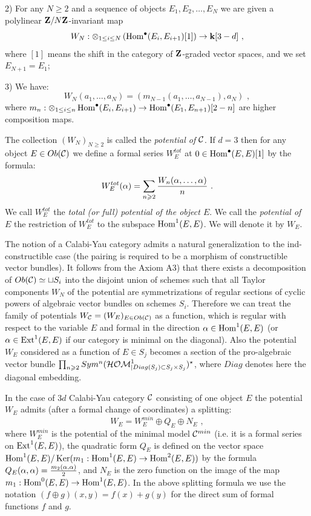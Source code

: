 \documentclass[12pt]{article}
\begin{document}
2) For any $N\geqslant 2$ and a sequence of objects $E_1,E_2,\dots,E_N$ we are given
a polylinear ${\bf Z}/N{\bf Z}$-invariant map
$$W_N: \otimes_{1\le i\le N}\left(\operatorname{Hom}^{\bullet}(E_i,E_{i+1})[1]\right)\to {\bf k}[3-d]\,\,,$$
where $[1]$ means the shift in the category
of ${\bf Z}$-graded vector spaces, and we set $E_{N+1}=E_1$;

3) We have:
$$W_N(a_1,\dots,a_{N})=(m_{N-1}(a_1,\dots,a_{N-1}),a_N)\,\,,$$
where $m_n: \otimes_{1\le i\le n}\operatorname{Hom}^{\bullet}(E_i,E_{i+1})\to \operatorname{Hom}^{\bullet}(E_1,E_{n+1})[2-n]$ are higher
composition maps.

The collection $(W_N)_{N\geqslant 2}$ is called the {\it potential of ${\mathcal C}$}.
If $d=3$ then for any object $E\in Ob({\mathcal C})$ we define a formal series $W_{E}^{tot}$ at $0\in \operatorname{Hom}^{\bullet}(E,E)[1]$
by the formula:
$$W_E^{tot}(\alpha)=\sum_{n\geqslant 2}{W_n(\alpha,\dots, \alpha)\over{n}}\,\,.$$
We call $W_E^{tot}$ the {\it total (or full) potential of the object $E$}. We call the {\it potential of $E$}
the restriction of $W_E^{tot}$ to the subspace $\operatorname{Hom}^1(E,E)$. We will denote it by $W_E$. 

The notion of a Calabi-Yau category admits a natural generalization to the ind-constructible case (the pairing is required to be a morphism of constructible  vector bundles). It follows from the Axiom A3)  that there exists a decomposition of $Ob({\mathcal C})\simeq \sqcup S_i$ into the disjoint union of schemes such that all Taylor components $W_N$ of the potential are symmetrizations of regular sections of cyclic powers of algebraic vector bundles on
schemes $S_i$. Therefore we can treat the family of potentials $W_{{\mathcal C}}=(W_E)_{E\in Ob({\mathcal C})}$ as a function, which is regular with respect to the variable $E$ and formal in the direction $\alpha\in \operatorname{Hom}^1(E,E)$
(or $\alpha\in \operatorname{Ext}^1(E,E)$ if our category is minimal on the diagonal). 
Also the  potential $W_E$ considered as a function of $E\in S_j$ becomes a section of the pro-algebraic vector bundle $\prod_{n\geqslant 2}Sym^n({\cal HOM}^1_{|Diag(S_j)\subset S_j\times S_j})^\star$, where $Diag$ denotes here the diagonal embedding.

\begin{prp} In the case of $3d$ Calabi-Yau category ${\mathcal C}$ consisting of one object $E$ the potential $W_E$ admits (after a formal change of coordinates) a splitting:
$$W_E=W_E^{min}\oplus Q_E\oplus N_E\,\,,$$
where $W_E^{min}$ is the potential of the minimal model ${\mathcal C}^{min}$ (i.e. it is a formal series on $\operatorname{Ext}^1(E,E)$),
the quadratic form $Q_E$ is defined on the vector space $\operatorname{Hom}^1(E,E)/\operatorname{Ker}(m_1:\operatorname{Hom}^1(E,E)\to \operatorname{Hom}^2(E,E))$ by the formula
$Q_E(\alpha,\alpha)={m_2(\alpha,\alpha)\over{2}}$, and $N_E$ is the zero function on the image of the map $m_1:\operatorname{Hom}^0(E,E)\to \operatorname{Hom}^1(E,E)$.
In the above splitting formula we use the notation $(f\oplus g)(x,y)=f(x)+g(y)$ for the direct sum of formal functions $f$ and $g$.


\end{prp}
\end{document}
